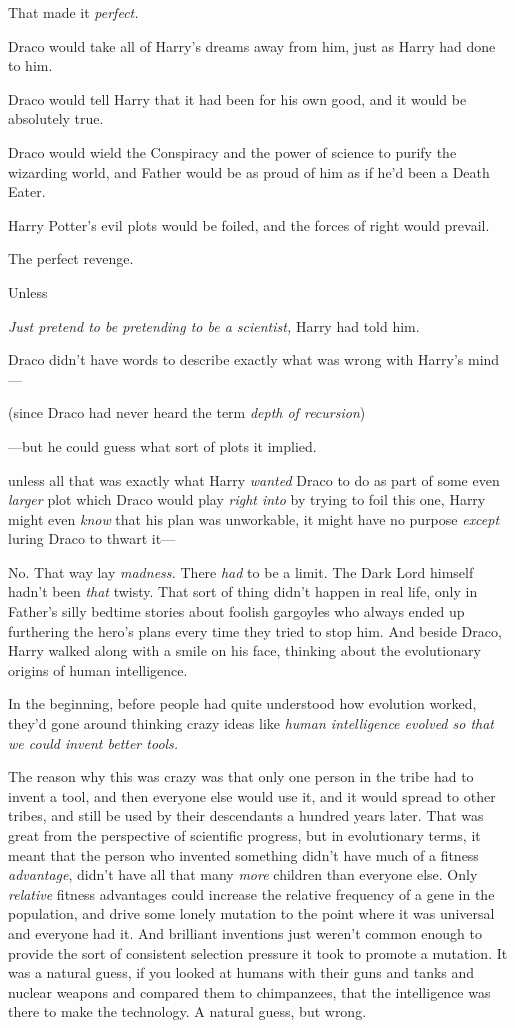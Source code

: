 That made it \emph{perfect.}

Draco would take all of Harry's dreams away from him, just as Harry had done to
him.

Draco would tell Harry that it had been for his own good, and it would be
absolutely true.

Draco would wield the Conspiracy and the power of science to purify the
wizarding world, and Father would be as proud of him as if he'd been a Death
Eater.

Harry Potter's evil plots would be foiled, and the forces of right would
prevail.

The perfect revenge.

Unless{\el}

\emph{Just pretend to be pretending to be a scientist,} Harry had told him.

Draco didn't have words to describe exactly what was wrong with Harry's mind---

(since Draco had never heard the term \emph{depth of recursion})

---but he could guess what sort of plots it implied.

{\el} unless all that was exactly what Harry \emph{wanted} Draco to do as
part of some even \emph{larger} plot which Draco would play \emph{right into}
by trying to foil this one, Harry might even \emph{know} that his plan was
unworkable, it might have no purpose \emph{except} luring Draco to thwart it---

No. That way lay \emph{madness.} There \emph{had} to be a limit. The Dark Lord
himself hadn't been \emph{that} twisty. That sort of thing didn't happen in
real life, only in Father's silly bedtime stories about foolish gargoyles who
always ended up furthering the hero's plans every time they tried to stop him.
\sbreak
And beside Draco, Harry walked along with a smile on his face, thinking about
the evolutionary origins of human intelligence.

In the beginning, before people had quite understood how evolution worked,
they'd gone around thinking crazy ideas like \emph{human intelligence evolved
so that we could invent better tools.}

The reason why this was crazy was that only one person in the tribe had to
invent a tool, and then everyone else would use it, and it would spread to
other tribes, and still be used by their descendants a hundred years later.
That was great from the perspective of scientific progress, but in evolutionary
terms, it meant that the person who invented something didn't have much of a
fitness \emph{advantage}, didn't have all that many \emph{more} children than
everyone else. Only \emph{relative} fitness advantages could increase the
relative frequency of a gene in the population, and drive some lonely mutation
to the point where it was universal and everyone had it. And brilliant
inventions just weren't common enough to provide the sort of consistent
selection pressure it took to promote a mutation. It was a natural guess, if
you looked at humans with their guns and tanks and nuclear weapons and compared
them to chimpanzees, that the intelligence was there to make the technology. A
natural guess, but wrong.

